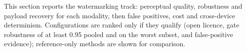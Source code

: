 This section reports the watermarking track: perceptual quality, robustness and payload recovery for each modality, then false positives, cost and cross-device determinism. Configurations are ranked only if they qualify (open licence, gate robustness of at least 0.95 pooled and on the worst subset, and false-positive evidence); reference-only methods are shown for comparison.

